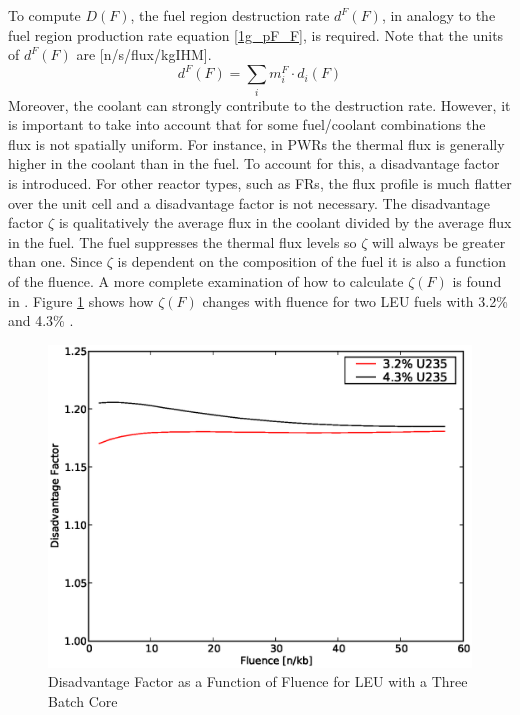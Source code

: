 To compute $D(F)$, the fuel region 
destruction rate $d^F(F)$, in analogy to the fuel region production rate equation \ref{1g_pF_F}, 
is required.  Note that the 
units of $d^F(F)$ are [n/s/flux/kgIHM].  
\begin{equation}
\label{1g_dF_F}
d^F(F) = \sum_i m_i^F \cdot d_i(F)
\end{equation}
Moreover, the coolant can strongly contribute to the destruction rate.  However, it is 
important to take into account that for some fuel/coolant combinations the flux is not 
spatially uniform.  For instance, in PWRs the thermal flux is generally higher in the coolant 
than in the fuel. To account for this, a disadvantage factor is introduced.  For other reactor 
types, such as FRs, the flux profile is much flatter over the unit cell and a disadvantage 
factor is not necessary. The disadvantage factor $\zeta$ is qualitatively the average flux in 
the coolant divided by the average flux in the fuel. The fuel suppresses the thermal flux 
levels so $\zeta$ will always be greater than one.
Since $\zeta$ is dependent on the composition of the fuel  it
is also a function of the fluence. A more complete examination of how to calculate $\zeta(F)$ is 
found in \cite{Lamarsh2002}.  Figure \ref{1g_fig04} 
shows how $\zeta(F)$ changes with fluence for two LEU fuels with 3.2\% and 4.3\% . 
\begin{figure}[htbp]
\caption{Disadvantage Factor as a Function of Fluence for LEU with a Three Batch Core}
\label{1g_fig04}
\begin{center}
\includegraphics[scale=0.5]{one_group_method/figs/Fig04.eps}
\end{center}
\end{figure}
